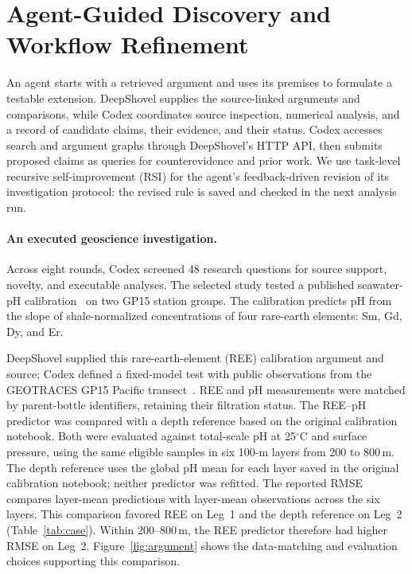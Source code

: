 \documentclass[sigconf,screen,review]{acmart}
\begin{document}
\section{Agent-Guided Discovery and Workflow Refinement}
\label{sec:agents}
An agent starts with a retrieved argument and uses its premises to formulate a testable extension. DeepShovel supplies the source-linked arguments and comparisons, while Codex coordinates source inspection, numerical analysis, and a record of candidate claims, their evidence, and their status. Codex accesses search and argument graphs through DeepShovel's HTTP API, then submits proposed claims as queries for counterevidence and prior work. We use task-level recursive self-improvement (RSI) for the agent's feedback-driven revision of its investigation protocol: the revised rule is saved and checked in the next analysis run.

\paragraph{An executed geoscience investigation.}
Across eight rounds, Codex screened 48 research questions for source support, novelty, and executable analyses. The selected study tested a published seawater-pH calibration~\cite{lin2024} on two GP15 station groups. The calibration predicts pH from the slope of shale-normalized concentrations of four rare-earth elements: Sm, Gd, Dy, and Er.

DeepShovel supplied this rare-earth-element (REE) calibration argument and source; Codex defined a fixed-model test with public observations from the GEOTRACES GP15 Pacific transect~\cite{gp15}. REE and pH measurements were matched by parent-bottle identifiers, retaining their filtration status. The REE--pH predictor was compared with a depth reference based on the original calibration notebook. Both were evaluated against total-scale pH at 25$^\circ$C and surface pressure, using the same eligible samples in six 100-m layers from 200 to 800\,m. The depth reference uses the global pH mean for each layer saved in the original calibration notebook; neither predictor was refitted. The reported RMSE compares layer-mean predictions with layer-mean observations across the six layers. This comparison favored REE on Leg~1 and the depth reference on Leg~2 (Table~\ref{tab:case}). Within 200--800\,m, the REE predictor therefore had higher RMSE on Leg~2. Figure~\ref{fig:argument} shows the data-matching and evaluation choices supporting this comparison.
\end{document}
